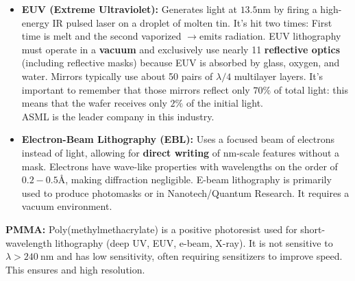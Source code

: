 \documentclass{report}
\begin{document}
\begin{itemize}
    \\$Kr+NF_3 \rightarrow
energy \rightarrow KrF \rightarrow photon$ $emission$
    \begin{itemize} 
        \item $KrF$ (Krypton Fluoride) at $\mathbf{248~\text{nm}}$ is used for $0.25~\mu \text{m}$ resolution.(lower wavelength than Hg, brighter). 
        \item $ArF$ (Argon Fluoride) at $\mathbf{193~\text{nm}}$ is used for $0.12~\mu \text{m}$ resolution. 
        \item $F_2$ at \textbf{157nm} was theorized but never used due to technical issues: finding suitable resists and transparent optical components at these wavelengths.
    \end{itemize} 
    \item \textbf{EUV (Extreme Ultraviolet):} Generates light at $\mathbf{13.5}\text{nm}$ by firing a high-energy IR pulsed laser on a droplet of molten tin. It's hit two times: First time is melt and the second vaporized $\rightarrow$emits radiation. EUV lithography must operate in a \textbf{vacuum} and exclusively use nearly 11 \textbf{reflective optics} (including reflective masks) because EUV is absorbed by glass, oxygen, and water. Mirrors typically use about 50 pairs of $\lambda/4$ multilayer layers. It's important to remember that those mirrors reflect only $70\%$ of total light: this means that the wafer receives only $2\%$ of the initial light.\\ASML is the leader company in this industry.
    \item \textbf{Electron-Beam Lithography (EBL):} Uses a focused beam of electrons instead of light, allowing for \textbf{direct writing} of nm-scale features without a mask. Electrons have wave-like properties with wavelengths on the order of $0.2-0.5\text{Å}$, making diffraction negligible. E-beam lithography is primarily used to produce photomasks or in Nanotech/Quantum Research. It requires a vacuum environment.
\end{itemize}
\textbf{PMMA:} Poly(methylmethacrylate) is a positive photoresist used for short-wavelength lithography (deep UV, EUV, e-beam, X-ray). It is not sensitive to $\lambda > 240~\text{nm}$ and has low sensitivity, often requiring sensitizers to improve speed. This ensures and high resolution.
\end{document}
